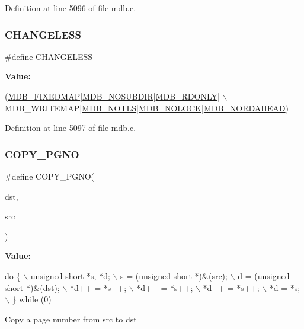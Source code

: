 Definition at line 5096 of file mdb.\+c.

\mbox{\label{group__internal_gabcfb3c5c09341252735704ee22684339}} 
\subsubsection{\texorpdfstring{C\+H\+A\+N\+G\+E\+L\+E\+SS}{CHANGELESS}}
{\footnotesize\ttfamily \#define C\+H\+A\+N\+G\+E\+L\+E\+SS}

{\bfseries Value\+:}
\begin{DoxyCode}
(\mbox{\hyperlink{group__mdb__env_ga492952277c481bc4a6fa08ef71c29487}{MDB\_FIXEDMAP}}|\mbox{\hyperlink{group__mdb__env_gabf0e3e3b1e18df6526969f6825a388ea}{MDB\_NOSUBDIR}}|\mbox{\hyperlink{group__mdb__env_gac4c41c0ae044127b2fc80420c323cac6}{MDB\_RDONLY}}| \(\backslash\)
    MDB\_WRITEMAP|\mbox{\hyperlink{group__mdb__env_ga5dca84a576d14b4bfe2deddc2dc622d3}{MDB\_NOTLS}}|\mbox{\hyperlink{group__mdb__env_ga9b0450b1a87cb9f22e033550e49e5037}{MDB\_NOLOCK}}|\mbox{\hyperlink{group__mdb__env_ga0fcdaf42f0c45749a2dff11ee322303f}{MDB\_NORDAHEAD}})
\end{DoxyCode}


Definition at line 5097 of file mdb.\+c.

\mbox{\label{group__internal_gaa2e6eaaa9f8fcfd2078846caf2249895}} 
\subsubsection{\texorpdfstring{C\+O\+P\+Y\+\_\+\+P\+G\+NO}{COPY\_PGNO}}
{\footnotesize\ttfamily \#define C\+O\+P\+Y\+\_\+\+P\+G\+NO(\begin{DoxyParamCaption}\item[{}]{dst,  }\item[{}]{src }\end{DoxyParamCaption})}

{\bfseries Value\+:}
\begin{DoxyCode}
\textcolor{keywordflow}{do} \{ \(\backslash\)
    unsigned \textcolor{keywordtype}{short} *s, *d;  \(\backslash\)
    s = (\textcolor{keywordtype}{unsigned} \textcolor{keywordtype}{short} *)&(src);   \(\backslash\)
    d = (\textcolor{keywordtype}{unsigned} \textcolor{keywordtype}{short} *)&(dst);   \(\backslash\)
    *d++ = *s++;    \(\backslash\)
    *d++ = *s++;    \(\backslash\)
    *d++ = *s++;    \(\backslash\)
    *d = *s;    \(\backslash\)
\} \textcolor{keywordflow}{while} (0)
\end{DoxyCode}
Copy a page number from src to dst 

